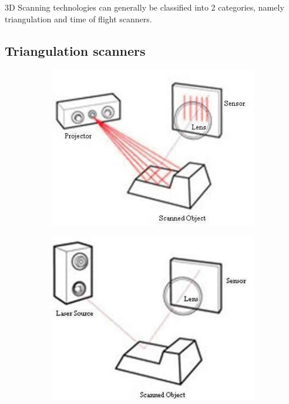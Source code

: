3D Scanning technologies can generally be classified into 2 categories, namely triangulation and time of flight scanners.

\subsection{Triangulation scanners}

\begin{figure}[H]
	\begin{subfigure}[b]{.33\textwidth}
	  \centering
	  \includegraphics[width=.9\linewidth]{images/structured-light-scan}
	  \caption{}
	\end{subfigure}%
	\begin{subfigure}[b]{.33\textwidth}
	  \centering
	  \includegraphics[width=.9\linewidth]{images/triangulate-laser-scan}
	  \caption{}
	\end{subfigure}
	\begin{subfigure}[b]{.33\textwidth}
	  \centering
		\begin{tikzpicture}[scale=2.5]


\end{tikzpicture}
\end{subfigure}
\end{figure}
